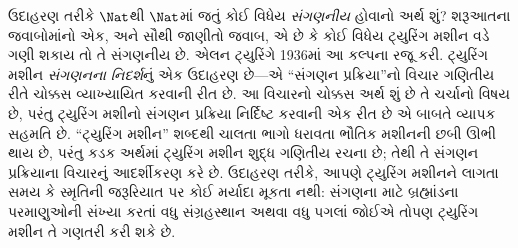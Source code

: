 \documentclass[../../../include/open-logic-section]{subfiles}
\begin{document}

ઉદાહરણ તરીકે $\Nat$થી $\Nat$માં જતું કોઈ વિધેય \emph{સંગણનીય}
હોવાનો અર્થ શું? શરૂઆતના જવાબોમાંનો એક, અને સૌથી જાણીતો જવાબ,
એ છે કે કોઈ વિધેય ટ્યુરિંગ મશીન વડે ગણી શકાય તો તે સંગણનીય છે.
એલન ટ્યુરિંગે 1936માં આ કલ્પના રજૂ કરી. ટ્યુરિંગ મશીન
\emph{સંગણનના નિદર્શ}નું એક ઉદાહરણ છે---એ ``સંગણન પ્રક્રિયા''નો
વિચાર ગણિતીય રીતે ચોક્કસ વ્યાખ્યાયિત કરવાની રીત છે. આ વિચારનો
ચોક્કસ અર્થ શું છે તે ચર્ચાનો વિષય છે, પરંતુ ટ્યુરિંગ મશીનો
સંગણન પ્રક્રિયા નિર્દિષ્ટ કરવાની એક રીત છે એ બાબતે વ્યાપક સહમતિ
છે. ``ટ્યુરિંગ મશીન'' શબ્દથી ચાલતા ભાગો ધરાવતા ભૌતિક મશીનની
છબી ઊભી થાય છે, પરંતુ કડક અર્થમાં ટ્યુરિંગ મશીન શુદ્ધ ગણિતીય
રચના છે; તેથી તે સંગણન પ્રક્રિયાના વિચારનું આદર્શીકરણ કરે છે.
ઉદાહરણ તરીકે, આપણે ટ્યુરિંગ મશીનને લાગતા સમય કે સ્મૃતિની
જરૂરિયાત પર કોઈ મર્યાદા મૂકતા નથી: સંગણના માટે બ્રહ્માંડના
પરમાણુઓની સંખ્યા કરતાં વધુ સંગ્રહસ્થાન અથવા વધુ પગલાં જોઈએ
તોપણ ટ્યુરિંગ મશીન તે ગણતરી કરી શકે છે.
\end{document}
